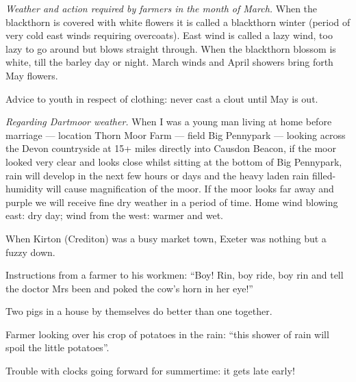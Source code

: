

\emph{Weather and action required by farmers in the month of March.} When the
blackthorn is covered with white flowers it is called a blackthorn winter
(period of very cold east winds requiring overcoats).  East wind is called a
lazy wind, too lazy to go around but blows straight through. When the
blackthorn blossom is white, till the barley day or night. March winds and
April showers bring forth May flowers.

\bigskip
\noindent Advice to youth in respect of clothing: never cast a clout until May
is out.

\bigskip
\noindent
\emph{Regarding Dartmoor weather.} When I was a young man living at home before
marriage --- location Thorn Moor Farm --- field Big Pennypark --- looking
across the Devon countryside at 15+ miles directly into Causdon Beacon, if the
moor looked very clear and looks close whilst sitting at the bottom of Big
Pennypark, rain will develop in the next few hours or days and the heavy laden
rain filled-humidity will cause magnification of the moor. If the moor looks
far away and purple we will receive fine dry weather in a period of time. Home
wind blowing east: dry day; wind from the west: warmer and wet.

\bigskip
\noindent When Kirton (Crediton) was a busy market town, Exeter was nothing but
a fuzzy down.

\bigskip
\noindent Instructions from a farmer to his workmen: ``Boy! Rin, boy ride, boy
rin and tell the doctor Mrs been and poked the cow's horn in her eye!''

\bigskip
\noindent Two pigs in a house by themselves do better than one together.

\bigskip
\noindent Farmer looking over his crop of potatoes in the rain: ``this shower of
rain will spoil the little potatoes''.

\bigskip
\noindent Trouble with clocks going forward for summertime: it gets late early!

\bigskip
\noindent
